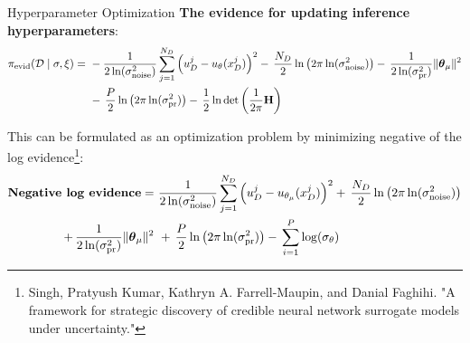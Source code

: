\documentclass[8pt,xcolor=dvipsnames,compress]{beamer}
\begin{document}
\begin{frame}{Hyperparameter Optimization}
\footnotesize
\textbf{The evidence for updating inference hyperparameters}:
\begin{align}
\pi_{\text{evid}}(\mathcal{D} \mid \sigma,\xi) =\ 
& -\frac{1}{2 \ln(\sigma_{\text{noise}}^2)} \sum_{j=1}^{N_D} 
    \left( u_D^j - u_{\theta_{\text{}}}(x_D^j) \right)^2
 -\, \frac{N_D}{2} \ln\left( 2\pi \ln(\sigma_{\text{noise}}^2) \right) 
-\, \frac{1}{2 \ln(\sigma_{\text{pr}}^2)} \| \boldsymbol{\theta}_{\mu} \|^2 \notag\\
& -\, \frac{P}{2} \ln\left( 2\pi \ln(\sigma_{\text{pr}}^2) \right) 
 -\, \frac{1}{2} \ln \det\left( \frac{1}{2\pi} \mathbf{H} \right)
\end{align}

This can be formulated as an optimization problem by minimizing negative of the log evidence\footnote{Singh, Pratyush Kumar, Kathryn A. Farrell-Maupin, and Danial Faghihi. "A framework for strategic discovery of credible neural network surrogate models under uncertainty." }:
\begin{align}
\textbf{Negative log evidence} = 
&\ \frac{1}{2 \ln(\sigma_{\text{noise}}^2)} \sum_{j=1}^{N_D} 
    \left( u_D^j - u_{\theta_{\mu}}(x_D^j) \right)^2 
 +\, \frac{N_D}{2} \ln\left( 2\pi \ln(\sigma_{\text{noise}}^2) \right) \notag\\
 +\, \frac{1}{2 \ln(\sigma_{\text{pr}}^2)} \| \boldsymbol{\theta}_{\mu} \|^2
&\ +\, \frac{P}{2} \ln\left( 2\pi \ln(\sigma_{\text{pr}}^2) \right) 
 -\, \sum_{i=1}^{P}\log(\sigma_{\theta})
\end{align}
\end{frame}
\end{document}
